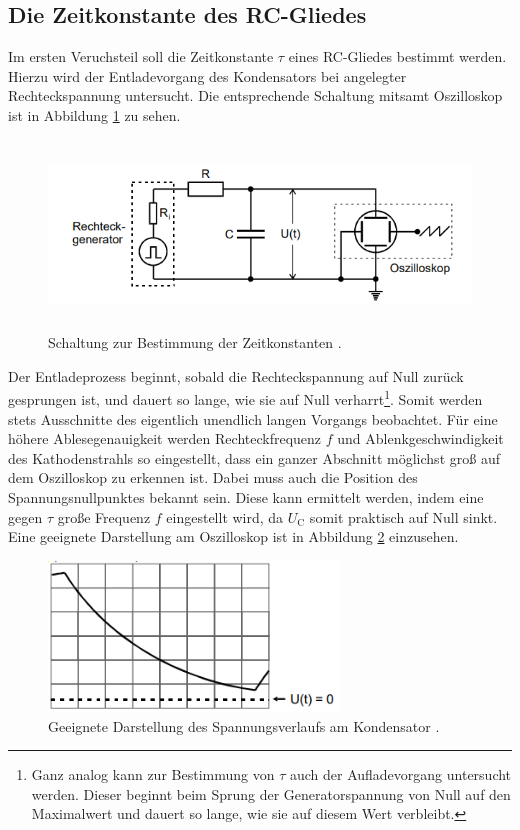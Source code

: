 \subsection{Die Zeitkonstante des RC-Gliedes}
Im ersten Veruchsteil soll die Zeitkonstante $\tau$ eines RC-Gliedes bestimmt werden.
Hierzu wird der Entladevorgang des Kondensators bei angelegter Rechteckspannung untersucht.
Die entsprechende Schaltung mitsamt Oszilloskop ist in Abbildung \ref{fig:zeitkonst} zu sehen.
\begin{figure}[H]
    \centering
    \includegraphics[height=5cm]{abbildungen/zeitkonstante.png}
    \caption[short]{Schaltung zur Bestimmung der Zeitkonstanten \cite{man:v353}.}
    \label{fig:zeitkonst}
\end{figure}
\noindent
Der Entladeprozess beginnt, sobald die Rechteckspannung auf Null zurück gesprungen ist, und dauert so lange, wie sie auf Null verharrt\footnote{Ganz 
analog kann zur Bestimmung von $\tau$ auch der Aufladevorgang untersucht werden.
Dieser beginnt beim Sprung der Generatorspannung von Null auf den Maximalwert und dauert so lange, 
wie sie auf diesem Wert verbleibt.}.
Somit werden stets Ausschnitte des eigentlich unendlich langen Vorgangs beobachtet.
Für eine höhere Ablesegenauigkeit werden Rechteckfrequenz $f$ und Ablenkgeschwindigkeit des Kathodenstrahls so eingestellt, 
dass ein ganzer Abschnitt möglichst groß auf dem Oszilloskop zu erkennen ist.
Dabei muss auch die Position des Spannungsnullpunktes bekannt sein.
Diese kann ermittelt werden, indem eine gegen $\tau$ große Frequenz $f$ eingestellt wird, da $U_\text{C}$ somit praktisch auf Null sinkt.
Eine geeignete Darstellung am Oszilloskop ist in Abbildung \ref{fig:spannungsverlauf} einzusehen.
\begin{figure}[H]
    \centering
    \includegraphics[height=4cm]{abbildungen/geeignete_darstellung.png}
    \caption{Geeignete Darstellung des Spannungsverlaufs am Kondensator \cite{man:v353}.}
    \label{fig:spannungsverlauf}
\end{figure}

